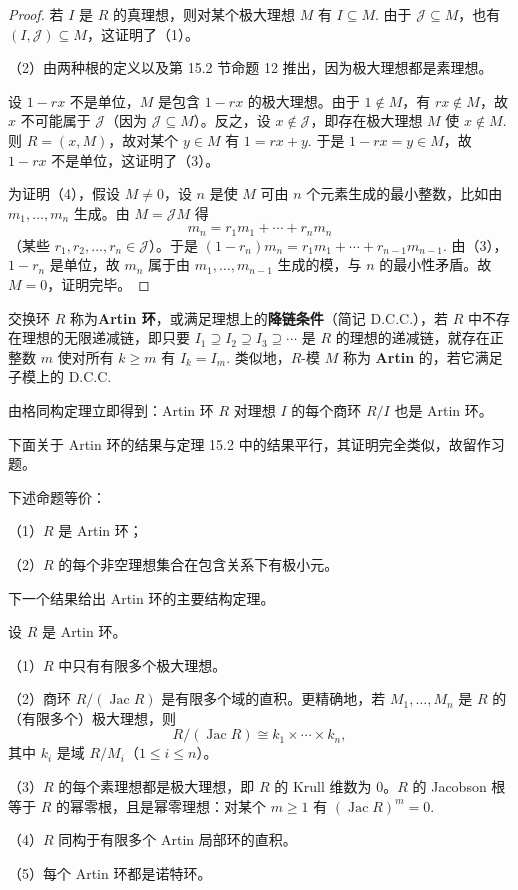 \begin{proof}
若 \(I\) 是 \(R\) 的真理想，则对某个极大理想 \(M\) 有 \(I \subseteq M\). 由于 \(\mathcal{J} \subseteq M\)，也有 \((I, \mathcal{J}) \subseteq M\)，这证明了（1）。

（2）由两种根的定义以及第 15.2 节命题 12 推出，因为极大理想都是素理想。

设 \(1-rx\) 不是单位，\(M\) 是包含 \(1-rx\) 的极大理想。由于 \(1 \notin M\)，有 \(rx \notin M\)，故 \(x\) 不可能属于 \(\mathcal{J}\)（因为 \(\mathcal{J} \subseteq M\)）。反之，设 \(x \notin \mathcal{J}\)，即存在极大理想 \(M\) 使 \(x \notin M\). 则 \(R = (x, M)\)，故对某个 \(y \in M\) 有 \(1 = rx+y\). 于是 \(1-rx = y \in M\)，故 \(1-rx\) 不是单位，这证明了（3）。

为证明（4），假设 \(M \neq 0\)，设 \(n\) 是使 \(M\) 可由 \(n\) 个元素生成的最小整数，比如由 \(m_1, \ldots, m_n\) 生成。由 \(M = \mathcal{J}M\) 得
\[
m_n = r_1m_1+\cdots+r_nm_n
\]
（某些 \(r_1, r_2, \ldots, r_n \in \mathcal{J}\)）。于是 \((1-r_n)m_n = r_1m_1+\cdots+r_{n-1}m_{n-1}\). 由（3），\(1-r_n\) 是单位，故 \(m_n\) 属于由 \(m_1, \ldots, m_{n-1}\) 生成的模，与 \(n\) 的最小性矛盾。故 \(M = 0\)，证明完毕。
\end{proof}

\begin{definition}
交换环 \(R\) 称为\textbf{Artin 环}，或满足理想上的\textbf{降链条件}（简记 D.C.C.），若 \(R\) 中不存在理想的无限递减链，即只要 \(I_1 \supseteq I_2 \supseteq I_3 \supseteq \cdots\) 是 \(R\) 的理想的递减链，就存在正整数 \(m\) 使对所有 \(k \geq m\) 有 \(I_k = I_m\). 类似地，\(R\)-模 \(M\) 称为 \textbf{Artin} 的，若它满足子模上的 D.C.C.
\end{definition}

由格同构定理立即得到：Artin 环 \(R\) 对理想 \(I\) 的每个商环 \(R/I\) 也是 Artin 环。

下面关于 Artin 环的结果与定理 15.2 中的结果平行，其证明完全类似，故留作习题。

\begin{proposition}\label{pro:16.2}
下述命题等价：

（1）\(R\) 是 Artin 环；

（2）\(R\) 的每个非空理想集合在包含关系下有极小元。
\end{proposition}

下一个结果给出 Artin 环的主要结构定理。

\begin{theorem}\label{thm:16.3}
设 \(R\) 是 Artin 环。

（1）\(R\) 中只有有限多个极大理想。

（2）商环 \(R/(\operatorname{Jac}R)\) 是有限多个域的直积。更精确地，若 \(M_1, \ldots, M_n\) 是 \(R\) 的（有限多个）极大理想，则
\[
R/(\operatorname{Jac}R) \cong k_1 \times \cdots \times k_n,
\]
其中 \(k_i\) 是域 \(R/M_i\)（\(1 \leq i \leq n\)）。

（3）\(R\) 的每个素理想都是极大理想，即 \(R\) 的 Krull 维数为 0。\(R\) 的 Jacobson 根等于 \(R\) 的幂零根，且是幂零理想：对某个 \(m \geq 1\) 有 \((\operatorname{Jac}R)^m = 0\).

（4）\(R\) 同构于有限多个 Artin 局部环的直积。

（5）每个 Artin 环都是诺特环。
\end{theorem}

